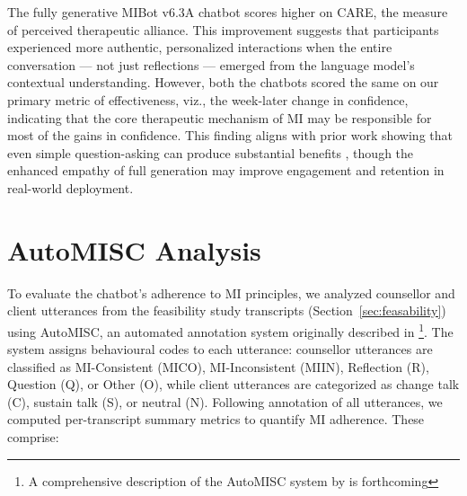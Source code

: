 The fully generative MIBot v6.3A chatbot scores higher on CARE, the measure of perceived therapeutic alliance. This improvement suggests that participants experienced more authentic, personalized interactions when the entire conversation --- not just reflections --- emerged from the language model's contextual understanding. However, both the chatbots scored the same on our primary metric of effectiveness, viz., the week-later change in confidence, indicating that the core therapeutic mechanism of MI may be responsible for most of the gains in confidence. This finding aligns with prior work showing that even simple question-asking can produce substantial benefits \citep{brown2023mi}, though the enhanced empathy of full generation may improve engagement and retention in real-world deployment.

\section{AutoMISC Analysis}
\label{sec:mi-adherence}

To evaluate the chatbot's adherence to MI principles, we analyzed counsellor and client utterances from the feasibility study transcripts (Section~\ref{sec:feasability}) using AutoMISC, an automated annotation system originally described in \citet{mahmood-etal-2025-fully}\footnote{A comprehensive description of the AutoMISC system by \citet{ali2025automated} is forthcoming}.
The system assigns behavioural codes to each utterance: counsellor utterances are classified as MI-Consistent (MICO), MI-Inconsistent (MIIN), Reflection (R), Question (Q), or Other (O), while client utterances are categorized as change talk (C), sustain talk (S), or neutral (N). Following annotation of all utterances, we computed per-transcript summary metrics to quantify MI adherence. These comprise:

